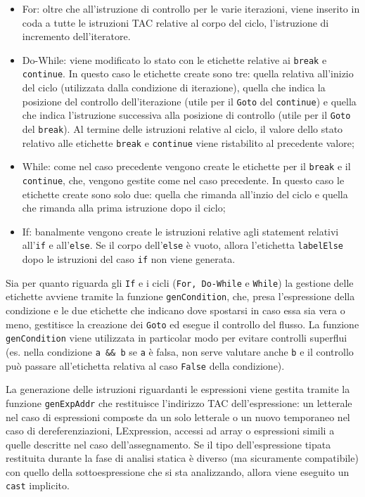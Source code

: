 \begin{itemize}
    \item For: oltre che all'istruzione di controllo per le varie iterazioni, viene inserito in coda a tutte le istruzioni TAC relative al corpo del ciclo, l'istruzione di incremento dell'iteratore. 
    
    \item Do-While: viene modificato lo stato con le etichette relative ai {\tt break} e {\tt continue}. In questo caso le etichette create sono tre: quella relativa all'inizio del ciclo (utilizzata dalla condizione di iterazione), quella che indica la posizione del controllo dell'iterazione (utile per il {\tt Goto}  del {\tt continue}) e quella che indica l'istruzione successiva alla posizione di controllo (utile per il {\tt Goto} del {\tt break}). Al termine delle istruzioni relative al ciclo, il valore dello stato relativo alle etichette {\tt break} e {\tt continue} viene ristabilito al precedente valore;
    \item While: come nel caso precedente vengono create le etichette per il {\tt break} e il {\tt continue}, che, vengono gestite come nel caso precedente. In questo caso le etichette create sono solo due: quella che rimanda all'inzio del ciclo e quella che rimanda alla prima istruzione dopo il ciclo;
    \item If: banalmente vengono create le istruzioni relative agli statement relativi all'{\tt if} e all'{\tt else}. Se il corpo dell'{\tt else} è vuoto, allora l'etichetta {\tt labelElse} dopo le istruzioni del caso {\tt if} non viene generata.
\end{itemize}

Sia per quanto riguarda gli {\tt If} e i cicli ({\tt For, Do-While} e {\tt While}) la gestione delle etichette avviene tramite la funzione {\tt genCondition}, che, presa l'espressione della condizione e le due etichette che indicano dove spostarsi in caso essa sia vera o meno, gestitisce la creazione dei {\tt Goto} ed esegue il controllo del flusso. La funzione {\tt genCondition} viene utilizzata in particolar modo per evitare controlli superflui (es. nella condizione {\tt a \&\& b} se {\tt a} è falsa, non serve valutare anche {\tt b} e il controllo può passare all'etichetta relativa al caso {\tt False} della condizione).


La generazione delle istruzioni riguardanti le espressioni viene gestita tramite la funzione {\tt genExpAddr} che restituisce l'indirizzo TAC dell'espressione: un letterale nel caso di espressioni composte da un solo letterale o un nuovo temporaneo nel caso di dereferenziazioni, LExpression, accessi ad array o espressioni simili a quelle descritte nel caso dell'assegnamento. Se il tipo dell'espressione tipata restituita durante la fase di analisi statica è diverso (ma sicuramente compatibile) con quello della sottoespressione che si sta analizzando, allora viene eseguito un {\tt cast} implicito.

